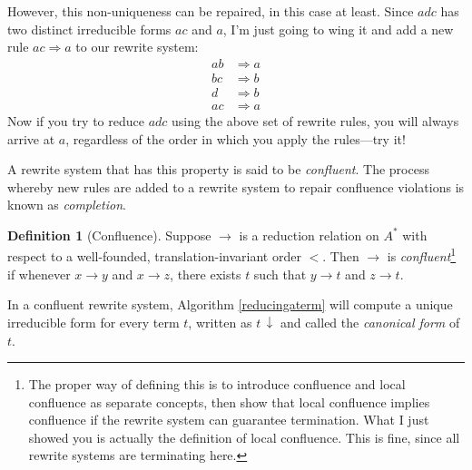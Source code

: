 \documentclass[a4paper,headsepline,bibliography=totoc,toc=flat,fleqn,twoside=semi]{scrbook}
\theoremstyle{definition}
\newtheorem{definition}{Definition}[chapter]
\theoremstyle{definition}
\theoremstyle{definition}
\begin{document}
However, this non-uniqueness can be repaired, in this case at least. Since $adc$ has two distinct irreducible forms $ac$ and $a$, I'm just going to wing it and add a new rule $ac\Rightarrow a$ to our rewrite system:
\setcounter{equation}{0}
\begin{align}
ab&\Rightarrow a\tag{1}\\
bc&\Rightarrow b\tag{2}\\
d&\Rightarrow b\tag{3}\\
ac&\Rightarrow a\tag{4}
\end{align}
Now if you try to reduce $adc$ using the above set of rewrite rules, you will always arrive at $a$, regardless of the order in which you apply the rules---try it!

A rewrite system that has this property is said to be \emph{confluent}. The process whereby new rules are added to a rewrite system to repair confluence violations is known as \emph{completion}.

\begin{definition}[Confluence]
Suppose $\rightarrow$ is a reduction relation on $A^*$ with respect to a well-founded, translation-invariant order $<$. Then $\rightarrow$ is \emph{confluent}\footnote{The proper way of defining this is to introduce confluence and local confluence as separate concepts, then show that local confluence implies confluence if the rewrite system can guarantee termination. What I just showed you is actually the definition of local confluence. This is fine, since all rewrite systems are terminating here.} if whenever $x\rightarrow y$ and $x\rightarrow z$, there exists $t$ such that $y\rightarrow t$ and $z\rightarrow t$.

In a confluent rewrite system, Algorithm \ref{reducingaterm} will compute a unique irreducible form for every term $t$, written as $t\,{\downarrow}$ and called the \emph{canonical form} of $t$.
\begin{figure}
\begin{center}
\end{center}
\end{figure}
\end{definition}
\end{document}
